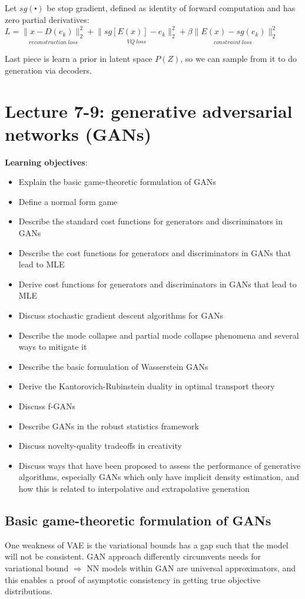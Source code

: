 \documentclass[12pt,a4paper]{article}
\begin{document}
Let $sg(\centerdot)$ be stop gradient, defined as identity of forward computation and has zero partial derivatives:\\
$L=\underset{reconstruction\ loss}{\|x-D(e_k)\|^2_2} + \underset{VQ\ loss}{\|sg[E(x)]-e_k\|^2_2 }+ \underset{constraint\ loss}{\beta\|E(x)-sg(e_k)\|_2^2}$

Last piece is learn a prior in latent space $P(Z)$, so we can sample from it to do generation via decoders. 

\section{Lecture 7-9: generative adversarial networks (GANs)}
\textbf{Learning objectives}:

\begin{itemize}
\item Explain the basic game-theoretic formulation of GANs
\item Define a normal form game
\item Describe the standard cost functions for generators and discriminators in GANs
\item Describe the cost functions for generators and discriminators in GANs that lead to MLE
\item Derive cost functions for generators and discriminators in GANs that lead to MLE
\item Discuss stochastic gradient descent algorithms for GANs
\item Describe the mode collapse and partial mode collapse phenomena and several ways to mitigate it
\item Describe the basic formulation of Wasserstein GANs
\item Derive the Kantorovich-Rubinstein duality in optimal transport theory
\item Discuss f-GANs
\item Describe GANs in the robust statistics framework
\item Discuss novelty-quality tradeoffs in creativity
\item Discuss ways that have been proposed to assess the performance of generative algorithms, especially GANs which only have implicit density estimation, and how this is related to interpolative and extrapolative generation
\end{itemize}

\subsection{Basic game-theoretic formulation of GANs}
One weakness of VAE is the variational bounds has a gap such that the model will not be consistent. GAN approach differently circumvents needs for variational bound $\Rightarrow$ NN models within GAN are universal approximators, and this enables a proof of asymptotic consistency in getting true objective distributions.
\end{document}

